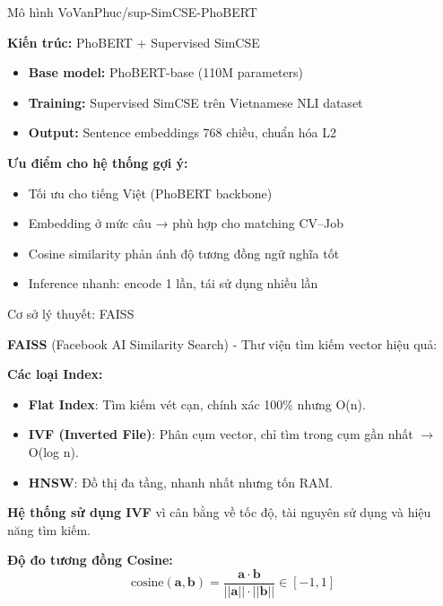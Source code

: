 \documentclass[aspectratio=169,xcolor=dvipsnames, t]{beamer}
\begin{document}
\begin{frame}{Mô hình VoVanPhuc/sup-SimCSE-PhoBERT}
\justifying
\small

\textbf{Kiến trúc:} PhoBERT + Supervised SimCSE
\begin{itemize}
    \item \textbf{Base model:} PhoBERT-base (110M parameters)
    \item \textbf{Training:} Supervised SimCSE trên Vietnamese NLI dataset
    \item \textbf{Output:} Sentence embeddings 768 chiều, chuẩn hóa L2
\end{itemize}

\vspace{0.3cm}
\textbf{Ưu điểm cho hệ thống gợi ý:}
\begin{itemize}
    \item Tối ưu cho tiếng Việt (PhoBERT backbone)
    \item Embedding ở mức câu → phù hợp cho matching CV–Job
    \item Cosine similarity phản ánh độ tương đồng ngữ nghĩa tốt
    \item Inference nhanh: encode 1 lần, tái sử dụng nhiều lần
\end{itemize}


\end{frame}



\begin{frame}{Cơ sở lý thuyết: FAISS}
\justifying
\small

\textbf{FAISS} (Facebook AI Similarity Search) - Thư viện tìm kiếm vector hiệu quả:

\vspace{0.3cm}
\textbf{Các loại Index:}
\begin{itemize}
    \item \textbf{Flat Index}: Tìm kiếm vét cạn, chính xác 100\% nhưng O(n).
    \item \textbf{IVF (Inverted File)}: Phân cụm vector, chỉ tìm trong cụm gần nhất $\rightarrow$ O(log n).
    \item \textbf{HNSW}: Đồ thị đa tầng, nhanh nhất nhưng tốn RAM.
\end{itemize}

\textbf{Hệ thống sử dụng IVF} vì cân bằng về tốc độ, tài nguyên sử dụng và hiệu năng tìm kiếm.

\vspace{0.3cm}
\textbf{Độ đo tương đồng Cosine:}
$$\text{cosine}(\mathbf{a}, \mathbf{b}) = \frac{\mathbf{a} \cdot \mathbf{b}}{||\mathbf{a}|| \cdot ||\mathbf{b}||} \in [-1, 1]$$

\end{frame}
\end{document}
